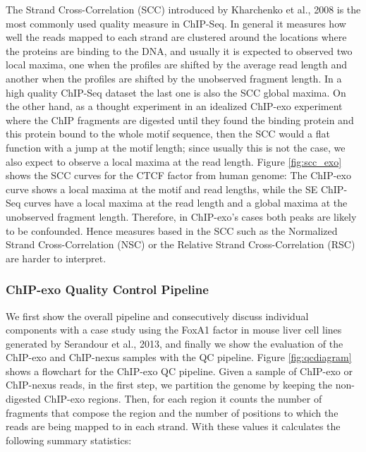 \documentclass{bmcart}\usepackage[]{graphicx}\usepackage[]{color}
\newcommand{\sig}{\sigma^{70}}
\begin{document}
The Strand Cross-Correlation (SCC) introduced by Kharchenko et al.,
2008\nocite{strandcc} is the most commonly used quality measure in
ChIP-Seq. In general it measures how well the reads mapped to each
strand are clustered around the locations where the proteins are
binding to the DNA, and usually it is expected to observed two local
maxima, one when the profiles are shifted by the average read length
and another when the profiles are shifted by the unobserved fragment
length. In a high quality ChIP-Seq dataset the last one is also the
SCC global maxima. On the other hand, as a thought experiment in an
idealized ChIP-exo experiment where the ChIP fragments are digested
until they found the binding protein and this protein bound to the
whole motif sequence, then the SCC would a flat function with a jump
at the motif length; since usually this is not the case, we also
expect to observe a local maxima at the read length. Figure
\ref{fig:scc_exo} shows the SCC curves for the CTCF factor from human
genome: The ChIP-exo curve shows a local maxima at the motif and read
lengths, while the SE ChIP-Seq curves have a local maxima at the read
length and a global maxima at the unobserved fragment
length. Therefore, in ChIP-exo's cases both peaks are likely to be
confounded. Hence measures based in the SCC such as the Normalized
Strand Cross-Correlation (NSC) or the Relative Strand
Cross-Correlation (RSC) are harder to interpret.



\subsubsection*{ChIP-exo Quality Control Pipeline}

We first show the overall pipeline and consecutively discuss
individual components with a case study using the FoxA1 factor in
mouse liver cell lines generated by Serandour et al., 2013, and
finally we show the evaluation of the ChIP-exo and ChIP-nexus samples
with the QC pipeline. Figure \ref{fig:qcdiagram} shows a flowchart for
the ChIP-exo QC pipeline. Given a sample of ChIP-exo or ChIP-nexus
reads, in the first step, we partition the genome by keeping the
non-digested ChIP-exo regions. Then, for each region it counts the
number of fragments that compose the region and the number of
positions to which the reads are being mapped to in each strand. With
these values it calculates the following summary statistics:
\end{document}
